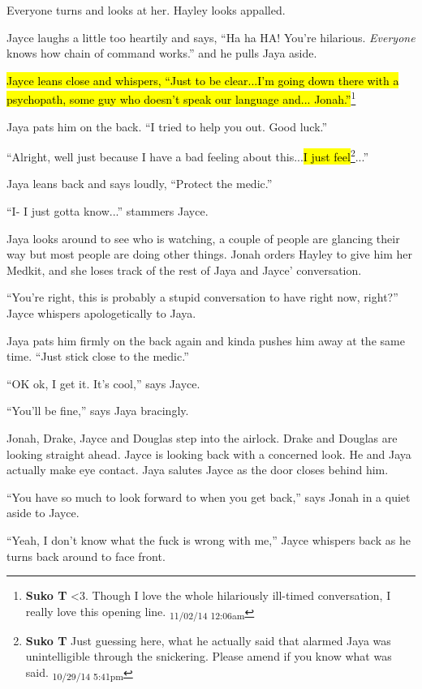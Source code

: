 Everyone turns and looks at her.  Hayley looks appalled.

Jayce laughs a little too heartily and says, ``Ha ha HA!  You're hilarious.  \textit{Everyone }knows how chain of command works.'' and he pulls Jaya aside.

\hl{Jayce leans close and whispers, ``Just to be clear...I'm going down there with a psychopath, some guy who doesn't speak our language and... Jonah.''}\footnote{\textbf{Suko T }\textless 3.  Though I love the whole hilariously ill-timed conversation, I really love this opening line. \textsubscript{11/02/14 12:06am}}

Jaya pats him on the back.  ``I tried to help you out.  Good luck.''

``Alright, well just because I have a bad feeling about this...\hl{I just feel}\footnote{\textbf{Suko T }Just guessing here, what he actually said that alarmed Jaya was unintelligible through the snickering.  Please amend if you know what was said. \textsubscript{10/29/14 5:41pm}}...''

Jaya leans back and says loudly, ``Protect the medic.''

``I- I just gotta know...'' stammers Jayce.

Jaya looks around to see who is watching, a couple of people are glancing their way but most people are doing other things.  Jonah orders Hayley to give him her Medkit, and she loses track of the rest of Jaya and Jayce' conversation.

``You're right, this is probably a stupid conversation to have right now, right?'' Jayce whispers apologetically to Jaya.

Jaya pats him firmly on the back again and kinda pushes him away at the same time.  ``Just stick close to the medic.''

``OK ok, I get it. It's cool,'' says Jayce.

``You'll be fine,'' says Jaya bracingly.





Jonah, Drake, Jayce and Douglas step into the airlock.  Drake and Douglas are looking straight ahead.  Jayce is looking back with a concerned look.  He and Jaya actually make eye contact.  Jaya salutes Jayce as the door closes behind him.

``You have so much to look forward to when you get back,'' says Jonah in a quiet aside to Jayce.

``Yeah, I don't know what the fuck is wrong with me,'' Jayce whispers back as he turns back around to face front.



